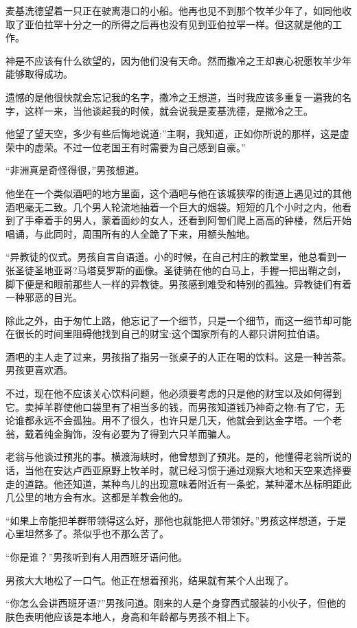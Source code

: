 \documentclass[twoside,openany]{book}
\begin{document}
麦基洗德望着一只正在驶离港口的小船。他再也见不到那个牧羊少年了，如同他收取了亚伯拉罕十分之一的所得之后再也没有见到亚伯拉罕一样。但这就是他的工作。

神是不应该有什么欲望的，因为他们没有天命。然而撒冷之王却衷心祝愿牧羊少年能够取得成功。

遗憾的是他很快就会忘记我的名字，撒冷之王想道，当时我应该多重复一遍我的名字，这样一来，当他谈起我的时候，就会说我是麦基洗德，是撒冷之王。

他望了望天空，多少有些后悔地说道:”主啊，我知道，正如你所说的那样，这是虚荣中的虚荣。不过一位老国王有时需要为自己感到自豪。”

“非洲真是奇怪得很，”男孩想道。

他坐在一个类似酒吧的地方里面，这个酒吧与他在该城狭窄的街道上遇见过的其他酒吧毫无二致。几个男人轮流地抽着一个巨大的烟袋。短短的几个小时之内，他看到了手牵着手的男人，蒙着面纱的女人，还看到阿訇们爬上高高的钟楼，然后开始唱诵，与此同时，周围所有的人全跪了下来，用额头触地。

“异教徒的仪式。男孩自言自语道。小的时候，在自己村庄的教堂里，他总看到一张圣徒圣地亚哥?马塔莫罗斯的画像。圣徒骑在他的白马上，手握一把出鞘之剑，脚下便是和眼前那些人一样的异教徒。男孩感到难受和特别的孤独。异教徒们有着一种邪恶的目光。

除此之外，由于匆忙上路，他忘记了一个细节，只是一个细节，而这一细节却可能在很长的时间里阻碍他找到自己的财宝:这个国家所有的人都只讲阿拉伯语。

酒吧的主人走了过来，男孩指了指另一张桌子的人正在喝的饮料。这是一种苦茶。男孩更喜欢酒。

不过，现在他不应该关心饮料问题，他必须要考虑的只是他的财宝以及如何得到它。卖掉羊群使他口袋里有了相当多的钱，而男孩知道钱乃神奇之物:有了它，无论谁都永远不会孤独。用不了很久，也许只是几天，他就会到达金字塔。一个老翁，戴着纯金胸饰，没有必要为了得到六只羊而骗人。

老翁与他谈过预兆的事。横渡海峡时，他曾想到了预兆。是的，他懂得老翁所说的话，当他在安达卢西亚原野上牧羊时，就已经习惯于通过观察大地和天空来选择要走的道路。他还知道，某种鸟儿的出现意味着附近有一条蛇，某种灌木丛标明距此几公里的地方会有水。这都是羊教会他的。

“如果上帝能把羊群带领得这么好，那他也就能把人带领好。”男孩这样想道，于是心里坦然多了。茶似乎也不那么苦了。

“你是谁？”男孩听到有人用西班牙语问他。

男孩大大地松了一口气。他正在想着预兆，结果就有某个人出现了。

“你怎么会讲西班牙语?”男孩问道。刚来的人是个身穿西式服装的小伙子，但他的肤色表明他应该是本地人，身高和年龄都与男孩不相上下。
\end{document}

